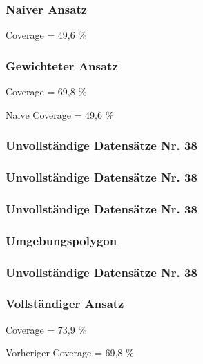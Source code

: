 \begin{frame}
  \frametitle{Naiver Ansatz}
  \begin{center}
  \huge{Coverage = 49,6 \%}
  \end{center}
\end{frame}

\begin{frame}
  \frametitle{Gewichteter Ansatz}
  \begin{center}
  \huge{Coverage = 69,8 \%}
  \end{center}
  \begin{center}
  Naive Coverage = 49,6 \%
  \end{center}
\end{frame}


\begin{frame}
  \frametitle{Unvollständige Datensätze \hfill Nr. 38}
\end{frame}


\begin{frame}
  \frametitle{Unvollständige Datensätze \hfill Nr. 38}
\end{frame}


\begin{frame}
  \frametitle{Unvollständige Datensätze \hfill Nr. 38}
\end{frame}


\begin{frame}
  \frametitle{Umgebungspolygon}
\end{frame}


\begin{frame}
  \frametitle{Unvollständige Datensätze \hfill Nr. 38}
\end{frame}


\begin{frame}
  \frametitle{Vollständiger Ansatz}
  \begin{center}
  \huge{Coverage = 73,9 \%}
  \end{center}
  \begin{center}
  Vorheriger Coverage =  69,8 \%
  \end{center}
\end{frame}

